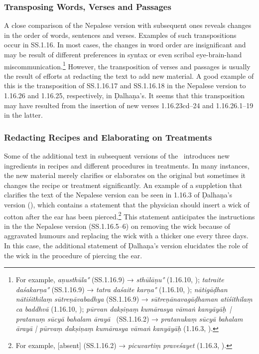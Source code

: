 \subsubsection{Transposing Words, Verses and Passages}
A close comparison of the Nepalese version with subsequent ones reveals changes in the order of words, sentences and verses. Examples of such transpositions occur in SS.1.16. In most cases, the changes in word order are insignificant and may be result of different preferences in syntax or even scribal eye-brain-hand miscommunication.\footnote{For example, \emph{aṇusthūla°} (SS.1.16.9) → \emph{sthūlāṇu°} (1.16.10, \cite[77]{vulgate}); \emph{tatraite daśakarṇa°} (SS.1.16.9) → \emph{tatra daśaite karṇa°} (1.16.10, \cite[77]{vulgate}); \emph{nātigāḍhan nātiśithilaṃ sūtreṇāvabadhya} (SS.1.16.9) → \emph{sūtreṇānavagāḍhaman atiśithilaṃ ca baddhvā} (1.16.10, \cite[77]{vulgate}); \emph{pūrvan dakṣiṇaṃ kumārasya vāmaṅ kanyāyāḥ | pratanuṃ sūcyā bahalam ārayā } (SS.1.16.2) → \emph{pratanukaṃ sūcyā bahalam ārayā | pūrvaṃ dakṣiṇaṃ kumārasya vāmaṅ kanyāyāḥ} (1.16.3, \cite[76]{vulgate}).} However, the transposition of verses and passages is usually the result of efforts at redacting the text to add new material. A good example of this is the transposition of SS.1.16.17 and SS.1.16.18 in the Nepalese version to 1.16.26 and 1.16.25, respectively, in Ḍalhaṇa's. It seems that this transposition may have resulted from the insertion of new verses 1.16.23cd–24 and 1.16.26.1–19 in the latter.


%
\subsubsection{Redacting Recipes and Elaborating on Treatments}
Some of the additional text in subsequent versions of the \SS\ introduces new ingredients in recipes and different procedures in treatments. In many instances, the new material merely clarifies or elaborates on the original but sometimes it changes the recipe or treatment significantly. An example of a suppletion that clarifies the text of the Nepalese version can be seen in 1.16.3 of Ḍalhaṇa's version (\cite[76]{vulgate}), which contains a statement that the physician should insert a wick of cotton after the ear has been pierced.\footnote{For example, [absent] (SS.1.16.2) → \emph{picuvartiṃ praveśayet} (1.16.3, \cite[76]{vulgate}).} This statement anticipates the instructions in the the Nepalese version (SS.1.16.5–6) on removing the wick because of aggravated humours and replacing the wick with a thicker one every three days. In this case, the additional statement of Ḍalhaṇa's version elucidates the role of the wick in the procedure of piercing the ear. 


